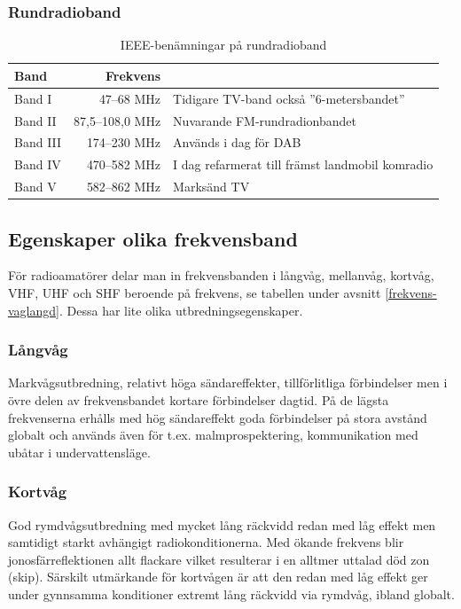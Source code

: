 \subsubsection{Rundradioband}

\begin{table}[H]
	\centering
	\begin{tabular}{lrl}
		\textbf{Band} & \textbf{Frekvens} &                                                 \\ \hline
		Band I        &        47--68 MHz & Tidigare TV-band också ''6-metersbandet''       \\
		Band II       &   87,5--108,0 MHz & Nuvarande FM-rundradionbandet                   \\
		Band III      &      174--230 MHz & Används i dag för DAB                           \\
		Band IV       &      470--582 MHz & I dag refarmerat till främst landmobil komradio \\
		Band V        &      582--862 MHz & Marksänd TV
	\end{tabular}
	\caption{IEEE-benämningar på rundradioband}
\end{table}


\subsection{Egenskaper olika frekvensband}

För radioamatörer delar man in frekvensbanden i långvåg, mellanvåg, kortvåg, VHF, UHF och SHF beroende på frekvens, se tabellen under avsnitt \ref{frekvens-vaglangd}. Dessa har lite olika utbredningsegenskaper.

\subsubsection{Långvåg}

Markvågsutbredning, relativt höga sändareffekter, tillförlitliga för\-bind\-el\-ser men i övre delen av frekvensbandet kortare förbindelser dagtid. På de lägsta frekvenserna erhålls med hög sändareffekt goda förbindelser på stora avstånd globalt och används även för t.ex. malmprospektering, kommunikation med ubåtar i undervattensläge.

\subsubsection{Kortvåg}

God rymdvågsutbredning med mycket lång räckvidd redan med låg effekt men samtidigt starkt avhängigt radiokonditionerna. Med ökande frekvens blir jonosfärreflektionen allt flackare vilket resulterar i en alltmer uttalad död zon (skip). Särskilt utmärkande för kortvågen är att den redan med låg effekt ger under gynnsamma konditioner extremt lång räckvidd via rymdvåg, ibland globalt.

